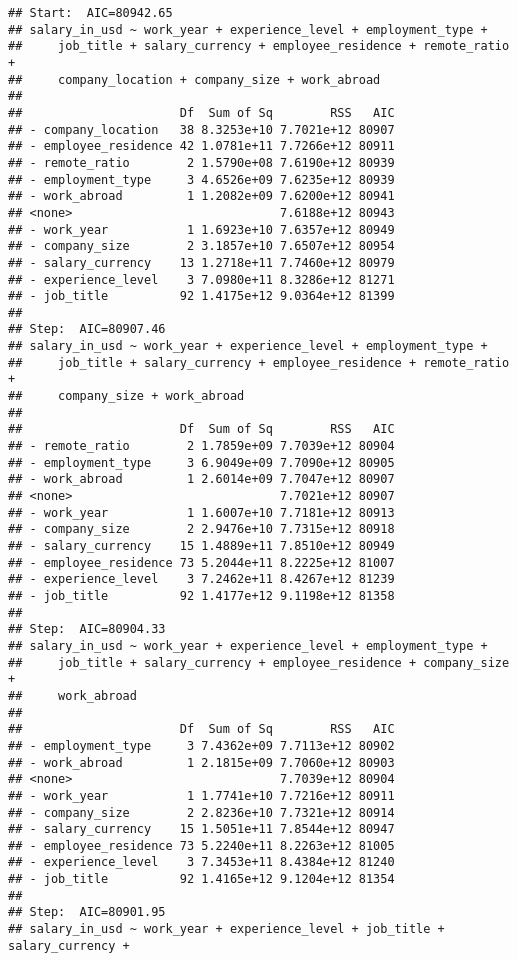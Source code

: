 \documentclass[
]{article}
\begin{document}
\begin{verbatim}
## Start:  AIC=80942.65
## salary_in_usd ~ work_year + experience_level + employment_type + 
##     job_title + salary_currency + employee_residence + remote_ratio + 
##     company_location + company_size + work_abroad
## 
##                      Df  Sum of Sq        RSS   AIC
## - company_location   38 8.3253e+10 7.7021e+12 80907
## - employee_residence 42 1.0781e+11 7.7266e+12 80911
## - remote_ratio        2 1.5790e+08 7.6190e+12 80939
## - employment_type     3 4.6526e+09 7.6235e+12 80939
## - work_abroad         1 1.2082e+09 7.6200e+12 80941
## <none>                             7.6188e+12 80943
## - work_year           1 1.6923e+10 7.6357e+12 80949
## - company_size        2 3.1857e+10 7.6507e+12 80954
## - salary_currency    13 1.2718e+11 7.7460e+12 80979
## - experience_level    3 7.0980e+11 8.3286e+12 81271
## - job_title          92 1.4175e+12 9.0364e+12 81399
## 
## Step:  AIC=80907.46
## salary_in_usd ~ work_year + experience_level + employment_type + 
##     job_title + salary_currency + employee_residence + remote_ratio + 
##     company_size + work_abroad
## 
##                      Df  Sum of Sq        RSS   AIC
## - remote_ratio        2 1.7859e+09 7.7039e+12 80904
## - employment_type     3 6.9049e+09 7.7090e+12 80905
## - work_abroad         1 2.6014e+09 7.7047e+12 80907
## <none>                             7.7021e+12 80907
## - work_year           1 1.6007e+10 7.7181e+12 80913
## - company_size        2 2.9476e+10 7.7315e+12 80918
## - salary_currency    15 1.4889e+11 7.8510e+12 80949
## - employee_residence 73 5.2044e+11 8.2225e+12 81007
## - experience_level    3 7.2462e+11 8.4267e+12 81239
## - job_title          92 1.4177e+12 9.1198e+12 81358
## 
## Step:  AIC=80904.33
## salary_in_usd ~ work_year + experience_level + employment_type + 
##     job_title + salary_currency + employee_residence + company_size + 
##     work_abroad
## 
##                      Df  Sum of Sq        RSS   AIC
## - employment_type     3 7.4362e+09 7.7113e+12 80902
## - work_abroad         1 2.1815e+09 7.7060e+12 80903
## <none>                             7.7039e+12 80904
## - work_year           1 1.7741e+10 7.7216e+12 80911
## - company_size        2 2.8236e+10 7.7321e+12 80914
## - salary_currency    15 1.5051e+11 7.8544e+12 80947
## - employee_residence 73 5.2240e+11 8.2263e+12 81005
## - experience_level    3 7.3453e+11 8.4384e+12 81240
## - job_title          92 1.4165e+12 9.1204e+12 81354
## 
## Step:  AIC=80901.95
## salary_in_usd ~ work_year + experience_level + job_title + salary_currency + 

\end{verbatim}
\end{document}
